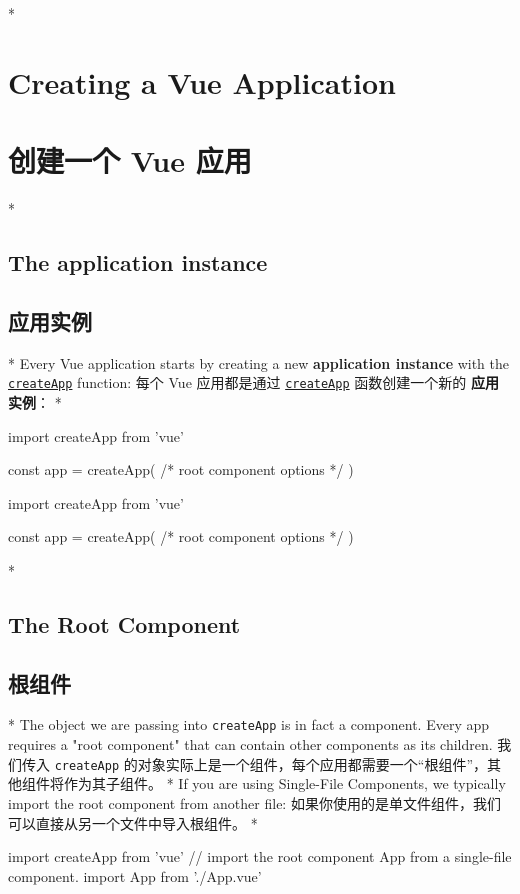\begin{paracol}{2}
\switchcolumn[0]*%
\section{Creating a Vue Application}
\switchcolumn
\section{创建一个 Vue 应用}
\switchcolumn[0]*%
\subsection{The application instance}
\switchcolumn
\subsection{应用实例}
\switchcolumn[0]*%
Every Vue application starts by creating a new \textbf{application
instance} with the
\href{https://vuejs.org/api/application.html\#createapp}{\texttt{createApp}}
function:
\switchcolumn
每个 Vue 应用都是通过
\href{https://cn.vuejs.org/api/application.html\#createapp}{\texttt{createApp}}
函数创建一个新的 \textbf{应用实例}：
\switchcolumn[0]*%
\begin{codeJs}
import { createApp } from 'vue'

const app = createApp({
    /* root component options */
})
\end{codeJs}
\switchcolumn
\begin{codeJs}
import { createApp } from 'vue'

const app = createApp({
    /* root component options */
})
\end{codeJs}
\switchcolumn[0]*%
\subsection{The Root Component}
\switchcolumn
\subsection{根组件}
\switchcolumn[0]*%
The object we are passing into \texttt{createApp} is in fact a
component. Every app requires a "root component" that can contain other
components as its children.
\switchcolumn
我们传入 \texttt{createApp}
的对象实际上是一个组件，每个应用都需要一个``根组件''，其他组件将作为其子组件。
\switchcolumn[0]*%
If you are using Single-File Components, we typically import the root
component from another file:
\switchcolumn
如果你使用的是单文件组件，我们可以直接从另一个文件中导入根组件。
\switchcolumn[0]*%
\begin{codeJs}
import { createApp } from 'vue'
// import the root component App from a single-file component.
import App from './App.vue'


\end{codeJs}
\end{paracol}
